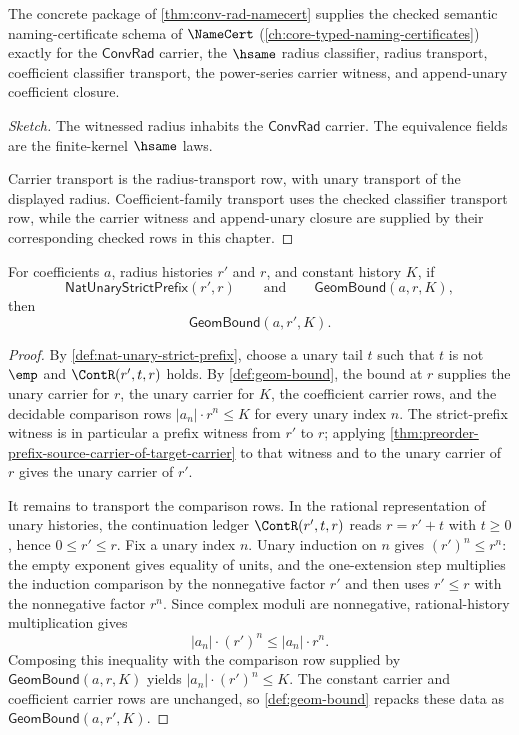 \begin{theorem}
\label{thm:conv-rad-semantic-namecert}
The concrete package of \autoref{thm:conv-rad-namecert} supplies the checked
semantic naming-certificate schema of $\NameCert$
(\autoref{ch:core-typed-naming-certificates}) exactly for the
$\mathsf{ConvRad}$ carrier, the $\hsame$ radius classifier, radius transport,
coefficient classifier transport, the power-series carrier witness, and
append-unary coefficient closure.
\end{theorem}
\begin{proof}[Sketch]
The witnessed radius inhabits the $\mathsf{ConvRad}$ carrier. The equivalence
fields are the finite-kernel $\hsame$ laws.

Carrier transport is the radius-transport row, with unary transport of the
displayed radius. Coefficient-family transport uses the checked classifier
transport row, while the carrier witness and append-unary closure are supplied
by their corresponding checked rows in this chapter.
\end{proof}

\begin{theorem}
\label{thm:geom-bound-radius-shrink-closed}
For coefficients $a$, radius histories $r'$ and $r$, and constant history $K$, if
$$
\mathsf{NatUnaryStrictPrefix}(r',r)
\qquad\text{and}\qquad
\mathsf{GeomBound}(a,r,K),
$$
then
$$
\mathsf{GeomBound}(a,r',K).
$$
\end{theorem}
\begin{proof}
By \autoref{def:nat-unary-strict-prefix}, choose a unary tail $t$ such that $t$ is not $\emp$ and $\ContR(r',t,r)$ holds. By \autoref{def:geom-bound}, the bound at $r$ supplies the unary carrier for $r$, the unary carrier for $K$, the coefficient carrier rows, and the decidable comparison rows $|a_n|\cdot r^n\leq K$ for every unary index $n$. The strict-prefix witness is in particular a prefix witness from $r'$ to $r$; applying \autoref{thm:preorder-prefix-source-carrier-of-target-carrier} to that witness and to the unary carrier of $r$ gives the unary carrier of $r'$.

It remains to transport the comparison rows. In the rational representation of unary histories, the continuation ledger $\ContR(r',t,r)$ reads $r=r'+t$ with $t\geq 0$, hence $0\leq r'\leq r$. Fix a unary index $n$. Unary induction on $n$ gives $(r')^n\leq r^n$: the empty exponent gives equality of units, and the one-extension step multiplies the induction comparison by the nonnegative factor $r'$ and then uses $r'\leq r$ with the nonnegative factor $r^n$. Since complex moduli are nonnegative, rational-history multiplication gives
$$
|a_n|\cdot (r')^n\leq |a_n|\cdot r^n.
$$
Composing this inequality with the comparison row supplied by $\mathsf{GeomBound}(a,r,K)$ yields $|a_n|\cdot (r')^n\leq K$. The constant carrier and coefficient carrier rows are unchanged, so \autoref{def:geom-bound} repacks these data as $\mathsf{GeomBound}(a,r',K)$.
\end{proof}

